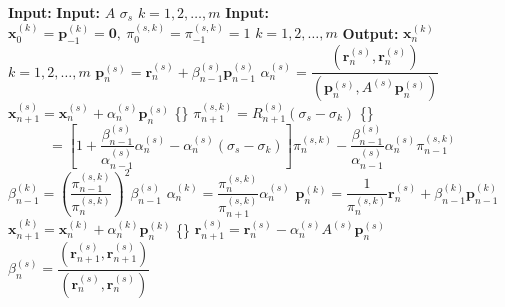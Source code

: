 \begin{algorithm}[H]\caption{}\label{alg:shifted-cg}\begin{algorithmic}[1]
\Statex\textbf{Input:} 
\Statex\textbf{Input:} $A$  $\sigma_s$  $k=1,2,\ldots,m$
\Statex\textbf{Input:} $\bm x_0^{(k)}=\bm p_{-1}^{(k)}=\bm0,\ \pi_0^{(s,k)}=\pi_{-1}^{(s,k)}=1$  $k=1,2,\ldots,m$
\Statex\textbf{Output:} $\bm x_n^{(k)}$  $k=1,2,\ldots,m$
\State $\bm p_n^{(s)}=\bm r_n^{(s)}+\beta_{n-1}^{(s)}\bm p_{n-1}^{(s)}$
\State $\alpha_n^{(s)}=\dfrac{(\bm r_n^{(s)},\bm r_n^{(s)})}{(\bm p_n^{(s)},A^{(s)}\bm p_n^{(s)})}$
\State $\bm x_{n+1}^{(s)}=\bm x_n^{(s)}+\alpha_n^{(s)}\bm p_n^{(s)}$
\State \{\}
\State $\pi_{n+1}^{(s,k)}=R_{n+1}^{(s)}(\sigma_s-\sigma_k)$ \{\}
\State $\phantom{\pi_{n+1}^{(s,k)}}=\left[1+\dfrac{\beta_{n-1}^{(s)}}{\alpha_{n-1}^{(s)}}\alpha_n^{(s)}-\alpha_n^{(s)}(\sigma_s-\sigma_k)\right]\pi_n^{(s,k)}-\dfrac{\beta_{n-1}^{(s)}}{\alpha_{n-1}^{(s)}}\alpha_n^{(s)}\pi_{n-1}^{(s,k)}$
\State $\beta_{n-1}^{(k)}=\left(\dfrac{\pi_{n-1}^{(s,k)}}{\pi_n^{(s,k)}}\right)^2\beta_{n-1}^{(s)}$
\State $\alpha_n^{(k)}=\dfrac{\pi_n^{(s,k)}}{\pi_{n+1}^{(s,k)}}\alpha_n^{(s)}$
\State $\bm p_n^{(k)}=\dfrac1{\pi_n^{(s,k)}}\bm r_n^{(s)}+\beta_{n-1}^{(k)}\bm p_{n-1}^{(k)}$
\State $\bm x_{n+1}^{(k)}=\bm x_n^{(k)}+\alpha_n^{(k)}\bm p_n^{(k)}$
\EndIf\EndFor
\State \{\}
\State $\bm r_{n+1}^{(s)}=\bm r_n^{(s)}-\alpha_n^{(s)}A^{(s)}\bm p_n^{(s)}$
\State $\beta_n^{(s)}=\dfrac{(\bm r_{n+1}^{(s)},\bm r_{n+1}^{(s)})}{(\bm r_n^{(s)},\bm r_n^{(s)})}$
\EndFor\end{algorithmic}\end{algorithm}
